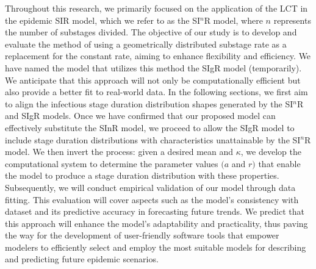 \documentclass[12pt]{article}
\begin{document}
Throughout this research, we primarily focused on the application of the LCT in the epidemic SIR model, which we refer to as the SI$^n$R model, where $n$ represents the number of substages divided. The objective of our study is to develop and evaluate the method of using a geometrically distributed substage rate as a replacement for the constant rate, aiming to enhance flexibility and efficiency. We have named the model that utilizes this method the SIgR model (temporarily). We anticipate that this approach will not only be computationally efficient but also provide a better fit to real-world data. In the following sections, we first aim to align the infectious stage duration distribution shapes generated by the SI$^n$R and SIgR models. Once we have confirmed that our proposed model can effectively substitute the SInR model, we proceed to allow the SIgR model to include stage duration distributions with characteristics unattainable by the SI$^n$R model. We then invert the process: given a desired mean and $\kappa$, we develop the computational system to determine the parameter values $(a$ and $r)$ that enable the model to produce a stage duration distribution with these properties. Subsequently, we will conduct empirical validation of our model through data fitting. This evaluation will cover aspects such as the model’s consistency with dataset and its predictive accuracy in forecasting future trends. We predict that this approach will enhance the model’s adaptability and practicality, thus paving the way for the development of user-friendly software tools that empower modelers to efficiently select and employ the most suitable models for describing and predicting future epidemic scenarios.
\end{document}
